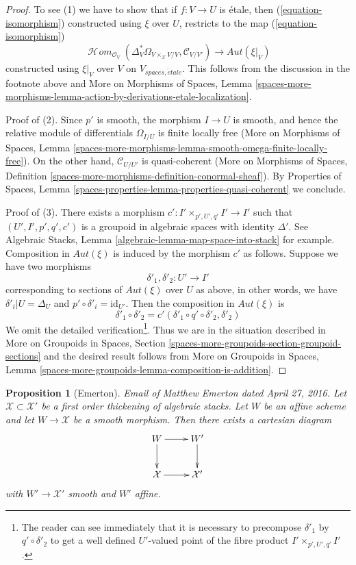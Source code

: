 \documentclass{stacks-project}
\newenvironment{reference}{\comment}{\endcomment}
\theoremstyle{plain}
\newtheorem{proposition}[subsection]{Proposition}
\theoremstyle{definition}
\theoremstyle{remark}
\numberwithin{equation}{subsection}
\def\SheafHom{\mathop{\mathcal{H}\!\mathit{om}}\nolimits}
\def\etale{{\acute{e}tale}}
\begin{document}
\begin{proof}
\medskip\noindent
To see (1) we have to show that if $f : V \to U$ is \'etale,
then (\ref{equation-isomorphism}) constructed using $\xi$ over $U$,
restricts to the map (\ref{equation-isomorphism})
$$
\SheafHom_{\mathcal{O}_V}(
\Delta_V^*\Omega_{V \times_\mathcal{X} V/V}, \mathcal{C}_{V/V'}) \to
\mathit{Aut}(\xi|_V)
$$
constructed using $\xi|_V$ over $V$ on $V_{spaces, \etale}$.
This follows from the discussion in the footnote above
and More on Morphisms of Spaces, Lemma
\ref{spaces-more-morphisms-lemma-action-by-derivations-etale-localization}.

\medskip\noindent
Proof of (2). Since $p'$ is smooth, the morphism $I \to U$ is smooth,
and hence the relative module of differentials $\Omega_{I/U}$
is finite locally free (More on Morphisms of Spaces, Lemma
\ref{spaces-more-morphisms-lemma-smooth-omega-finite-locally-free}).
On the other hand, $\mathcal{C}_{U/U'}$ is quasi-coherent
(More on Morphisms of Spaces, Definition
\ref{spaces-more-morphisms-definition-conormal-sheaf}).
By Properties of Spaces, Lemma
\ref{spaces-properties-lemma-properties-quasi-coherent}
we conclude.

\medskip\noindent
Proof of (3). There exists a morphism $c' : I' \times_{p', U', q'} I' \to I'$
such that $(U', I', p', q', c')$ is a groupoid in algebraic spaces
with identity $\Delta'$. See
Algebraic Stacks, Lemma \ref{algebraic-lemma-map-space-into-stack} for example.
Composition in $\mathit{Aut}(\xi)$ is induced by the morphism
$c'$ as follows. Suppose we have two morphisms
$$
\delta'_1, \delta'_2 : U' \longrightarrow I'
$$
corresponding to sections of $\mathit{Aut}(\xi)$ over $U$ as above,
in other words, we have $\delta'_i|U = \Delta_U$ and
$p' \circ \delta'_i = \text{id}_{U'}$. Then the composition
in $\mathit{Aut}(\xi)$ is
$$
\delta'_1 \circ \delta'_2 = c'(\delta'_1 \circ q' \circ \delta'_2, \delta'_2)
$$
We omit the detailed verification\footnote{The reader can see immediately
that it is necessary to precompose
$\delta'_1$ by $q' \circ \delta'_2$ to get a well defined $U'$-valued
point of the fibre product $I' \times_{p', U', q'} I'$.}.
Thus we are in the situation described in
More on Groupoids in Spaces, Section
\ref{spaces-more-groupoids-section-groupoid-sections}
and the desired result follows from
More on Groupoids in Spaces, Lemma
\ref{spaces-more-groupoids-lemma-composition-is-addition}.
\end{proof}

\begin{proposition}[Emerton]
\label{proposition-affine-smooth-lift-to-first-order}
\begin{reference}
Email of Matthew Emerton dated April 27, 2016.
\end{reference}
Let $\mathcal{X} \subset \mathcal{X}'$ be a first order thickening
of algebraic stacks. Let $W$ be an affine scheme and let
$W \to \mathcal{X}$ be a smooth morphism. Then there exists
a cartesian diagram
$$
\xymatrix{
W \ar[d] \ar[r] & W' \ar[d] \\
\mathcal{X} \ar[r] & \mathcal{X}'
}
$$
with $W' \to \mathcal{X}'$ smooth and $W'$ affine.
\end{proposition}
\end{document}
